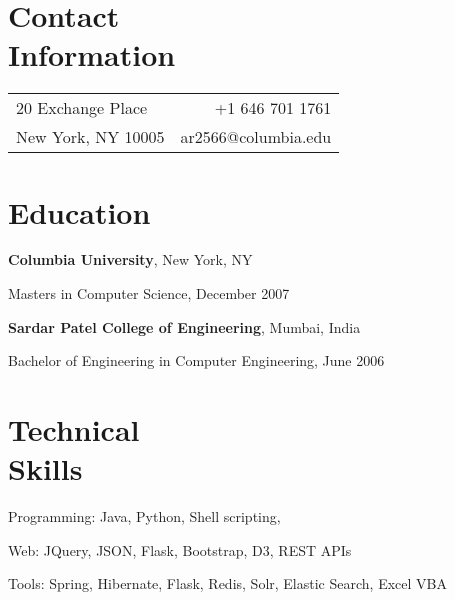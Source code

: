 \documentclass[margin,line]{resume}
\begin{document}
\begin{resume}

    \section{\mysidestyle Contact\\Information}\vspace{2mm}

\begin{tabular*}{1.0\textwidth}%
{@{\extracolsep{\fill}}lr}
20 Exchange Place & +1 646 701 1761 \\
New York, NY 10005 & ar2566@columbia.edu \\
\end{tabular*}

    \section{\mysidestyle Education}

    {\bf Columbia University}, New York, NY \vspace{2mm}%
    \begin{list1}
    \item[] Masters in Computer Science, December 2007
	
    \vspace*{2mm}
    {\bf Sardar Patel College of Engineering}, Mumbai, India \vspace{2mm}%
    \item[] Bachelor of Engineering in Computer Engineering, June 2006
    \vspace*{1mm}
    \end{list1}
    
    
    \vspace*{-2mm}
    
    \section{\mysidestyle Technical\\Skills} 

    \begin{list2}
        \setlength{\itemsep}{3pt}
        \item Programming: Java, Python, Shell scripting, \LaTeXe
        \item Web: JQuery, JSON, Flask, Bootstrap, D3, REST APIs
        \item Tools: Spring, Hibernate, Flask, Redis, Solr, Elastic Search, Excel VBA
    \end{list2}
   \vspace*{-2mm}

\end{resume}
\end{document}
